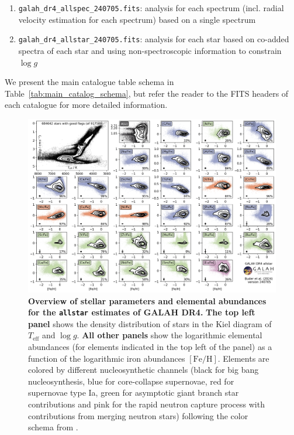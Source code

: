 \documentclass[
  journal=pasa,
  manuscript=research-paper, %
  year=2024,
  volume=37
]{cup-journal}
\newcommand{\Teff}{$T_\mathrm{eff}$\xspace}
\newcommand{\logg}{$\log g$\xspace}
\newcommand{\feh}{$\mathrm{[Fe/H]}$\xspace}
\begin{document}
\begin{enumerate}
   \item \texttt{galah\_dr4\_allspec\_240705.fits}: analysis for each spectrum (incl. radial velocity estimation for each spectrum) based on a single spectrum
   \item \texttt{galah\_dr4\_allstar\_240705.fits}: analysis for each star based on co-added spectra of each star and using non-spectroscopic information to constrain \logg
\end{enumerate}

We present the main catalogue table schema in Table~\ref{tab:main_catalog_schema}, but refer the reader to the FITS headers of each catalogue for more detailed information.

\begin{landscape}
\begin{figure}[ht]
\includegraphics[width=0.975\columnwidth]{figures/galah_dr4_overview_allstar.png}
\caption{
\textbf{Overview of stellar parameters and elemental abundances for the \texttt{allstar} estimates of GALAH DR4.}
\textbf{The top left panel} shows the density distribution of stars in the Kiel diagram of \Teff and \logg.
\textbf{All other panels} show the logarithmic elemental abundances (for elements indicated in the top left of the panel) as a function of the logarithmic iron abundances \feh. Elements are colored by different nucleosynthetic channels (black for big bang nucleosynthesis, blue for core-collapse supernovae, red for supernovae type Ia, green for asymptotic giant branch star contributions and pink for the rapid neutron capture process with contributions from merging neutron stars) following the color schema from \citet{Kobayashi2020}.
}
\label{fig:galah_dr4_overview_allstar}
\end{figure}
\end{landscape}
\end{document}
